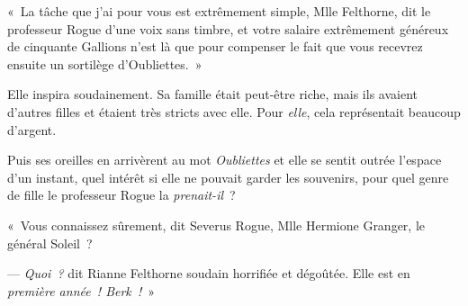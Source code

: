«~La tâche que j'ai pour vous est extrêmement simple, Mlle Felthorne, dit le professeur Rogue d'une voix sans timbre, et votre salaire extrêmement généreux de cinquante Gallions n'est là que pour compenser le fait que vous recevrez ensuite un sortilège d'Oubliettes.~»

Elle inspira soudainement. Sa famille était peut-être riche, mais ils avaient d'autres filles et étaient très stricts avec elle. Pour \emph{elle}, cela représentait beaucoup d'argent.

Puis ses oreilles en arrivèrent au mot \emph{Oubliettes} et elle se sentit outrée l'espace d'un instant, quel intérêt si elle ne pouvait garder les souvenirs, pour quel genre de fille le professeur Rogue la \emph{prenait-il}~?

«~Vous connaissez sûrement, dit Severus Rogue, Mlle Hermione Granger, le général Soleil~?

--- \emph{Quoi~?} dit Rianne Felthorne soudain horrifiée et dégoûtée. Elle est en \emph{première année~! Berk~!}~»
